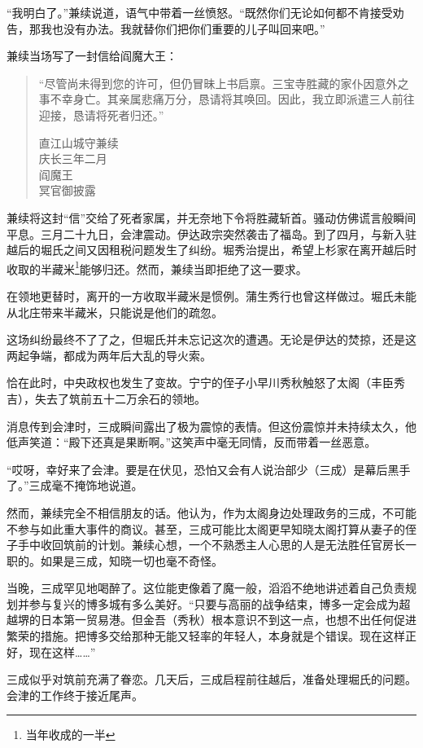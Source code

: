 \documentclass[
]{article}
\begin{document}
``我明白了。''兼续说道，语气中带着一丝愤怒。``既然你们无论如何都不肯接受劝告，那我也没有办法。我就替你们把你们重要的儿子叫回来吧。''

兼续当场写了一封信给阎魔大王：

\begin{quote}
``尽管尚未得到您的许可，但仍冒昧上书启禀。三宝寺胜藏的家仆因意外之事不幸身亡。其亲属悲痛万分，恳请将其唤回。因此，我立即派遣三人前往迎接，恳请将死者归还。''

直江山城守兼续\\
庆长三年二月\\
阎魔王\\
冥官御披露
\end{quote}

兼续将这封``信''交给了死者家属，并无奈地下令将胜藏斩首。骚动仿佛谎言般瞬间平息。三月二十九日，会津震动。伊达政宗突然袭击了福岛。到了四月，与新入驻越后的堀氏之间又因租税问题发生了纠纷。堀秀治提出，希望上杉家在离开越后时收取的半藏米\footnote{当年收成的一半}能够归还。然而，兼续当即拒绝了这一要求。

在领地更替时，离开的一方收取半藏米是惯例。蒲生秀行也曾这样做过。堀氏未能从北庄带来半藏米，只能说是他们的疏忽。

这场纠纷最终不了了之，但堀氏并未忘记这次的遭遇。无论是伊达的焚掠，还是这两起争端，都成为两年后大乱的导火索。

恰在此时，中央政权也发生了变故。宁宁的侄子小早川秀秋触怒了太阁（丰臣秀吉），失去了筑前五十二万余石的领地。

消息传到会津时，三成瞬间露出了极为震惊的表情。但这份震惊并未持续太久，他低声笑道：``殿下还真是果断啊。''这笑声中毫无同情，反而带着一丝恶意。

``哎呀，幸好来了会津。要是在伏见，恐怕又会有人说治部少（三成）是幕后黑手了。''三成毫不掩饰地说道。

然而，兼续完全不相信朋友的话。他认为，作为太阁身边处理政务的三成，不可能不参与如此重大事件的商议。甚至，三成可能比太阁更早知晓太阁打算从妻子的侄子手中收回筑前的计划。兼续心想，一个不熟悉主人心思的人是无法胜任官房长一职的。如果是三成，知晓一切也毫不奇怪。

当晚，三成罕见地喝醉了。这位能吏像着了魔一般，滔滔不绝地讲述着自己负责规划并参与复兴的博多城有多么美好。``只要与高丽的战争结束，博多一定会成为超越堺的日本第一贸易港。但金吾（秀秋）根本意识不到这一点，也想不出任何促进繁荣的措施。把博多交给那种无能又轻率的年轻人，本身就是个错误。现在这样正好，现在这样\ldots\ldots{}''

三成似乎对筑前充满了眷恋。几天后，三成启程前往越后，准备处理堀氏的问题。会津的工作终于接近尾声。
\end{document}
